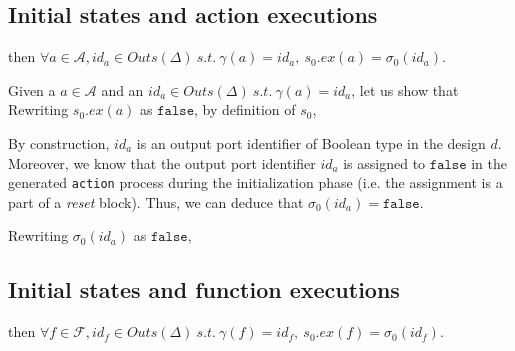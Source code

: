 \documentclass[dvipsnames,12pt]{article}
\begin{document}
\subsection{Initial states and action executions}
\label{sec:init-states-act-exec}

\begin{lemma}
  \label{lem:init-states-act-exec}
  \inithyps{} 
  then
  $\forall{}a\in\mathcal{A},id_a\in{}Outs(\Delta)~s.t.~\gamma(a)=id_a,~s_0.ex(a)=\sigma_0(id_a)$.
\end{lemma}

\begin{niproof}
  Given a $a\in\mathcal{A}$ and an
  $id_a\in{}Outs(\Delta)~s.t.~\gamma(a)=id_a$, let us show that
  \\

  Rewriting $s_0.ex(a)$ as $\mathtt{false}$, by definition of $s_0$,

  By construction, $id_a$ is an output port identifier of Boolean type
  in the \hvhdl{} design $d$. Moreover, we know that the output port
  identifier $id_a$ is assigned to $\mathtt{false}$ in the generated
  \texttt{action} process during the initialization phase (i.e. the
  assignment is a part of a \emph{reset} block). Thus, we can deduce
  that $\sigma_0(id_a)=\mathtt{false}$.
  
  Rewriting $\sigma_0(id_a)$ as $\mathtt{false}$, 
  
\end{niproof}

\subsection{Initial states and function executions}
\label{sec:init-states-fun-exec}

\begin{lemma}
  \label{lem:init-states-fun-exec}
  \inithyps{} 
  then
  $\forall{}f\in\mathcal{F},id_f\in{}Outs(\Delta)~s.t.~\gamma(f)=id_f,~s_0.ex(f)=\sigma_0(id_f)$.
\end{lemma}
\end{document}
